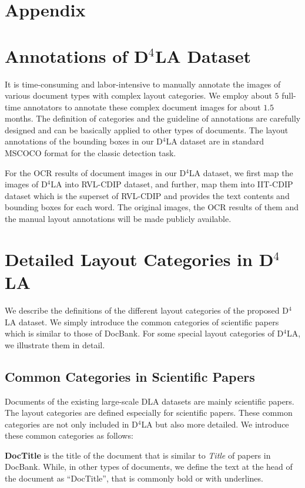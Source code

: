 \documentclass[10pt,twocolumn,letterpaper]{article}
\begin{document}
{\small


}

\clearpage
\appendix

\section*{Appendix}
\section{Annotations of D$^4$LA Dataset}
It is time-consuming and labor-intensive to manually annotate the images of various document types with complex layout categories.
We employ about $5$ full-time annotators to annotate these complex document images for about $1.5$ months.
The definition of categories and the guideline of annotations are carefully designed and can be basically applied to other types of documents.
The layout annotations of the bounding boxes in our D$^4$LA dataset are in standard MSCOCO format for the classic detection task.

For the OCR results of document images in our D$^4$LA dataset, we first map the images of D$^4$LA into RVL-CDIP dataset, 
and further, map them into IIT-CDIP dataset which is the superset of RVL-CDIP and provides the text contents and bounding boxes for each word.
The original images, the OCR results of them and the manual layout annotations will be made publicly available.


\section{Detailed Layout Categories in D$^4$LA}
We describe the definitions of the different layout categories of the proposed D$^4$LA dataset.
We simply introduce the common categories of scientific papers which is similar to those of DocBank.
For some special layout categories of D$^4$LA, we illustrate them in detail.


\subsection{Common Categories in Scientific Papers} 
Documents of the existing large-scale DLA datasets are mainly scientific papers.
The layout categories are defined especially for scientific papers.
These common categories are not only included in D$^4$LA
but also more detailed.
We introduce these common categories as follows:


\noindent
\textbf{DocTitle} is the title of the document that is similar to \textit{Title} of papers in DocBank. 
While, in other types of documents, we define the text at the head of the document as ``DocTitle'',
that is commonly bold or with underlines.
\end{document}
